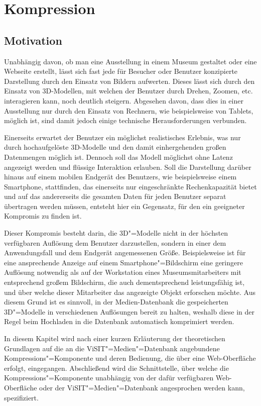 \section{Kompression}\label{sec:compression}

\subsection{Motivation}

Unabhängig davon, ob man eine Ausstellung in einem Museum gestaltet oder eine Webseite erstellt, lässt sich fast jede für Besucher oder Benutzer konzipierte Darstellung durch den Einsatz von Bildern aufwerten. Dieses lässt sich durch den Einsatz von 3D-Modellen, mit welchen der Benutzer durch Drehen, Zoomen, etc. interagieren kann, noch deutlich steigern. Abgesehen davon, dass dies in einer Ausstellung nur durch den Einsatz von Rechnern, wie beispielsweise von Tablets, möglich ist, sind damit jedoch einige technische Herausforderungen verbunden.

Einerseits erwartet der Benutzer ein möglichst realistisches Erlebnis, was nur durch hochaufgelöste 3D-Modelle und den damit einhergehenden großen Datenmengen möglich ist. Dennoch soll das Modell möglichst ohne Latenz angezeigt werden und flüssige Interaktion erlauben. Soll die Darstellung darüber hinaus auf einem mobilen Endgerät des Benutzers, wie beispielsweise einem Smartphone, stattfinden, das einerseits nur eingeschränkte Rechenkapazität bietet und auf das andererseits die gesamten Daten für jeden Benutzer separat übertragen werden müssen, entsteht hier ein Gegensatz, für den ein geeigneter Kompromis zu finden ist.

Dieser Kompromis besteht darin, die 3D"=Modelle nicht in der höchsten verfügbaren Auflösung dem Benutzer darzustellen, sondern in einer dem Anwendungsfall und dem Endgerät angemessenen Größe. Beispielsweise ist für eine ansprechende Anzeige auf einem Smartphone"=Bildschirm eine geringere Auflösung notwendig als auf der Workstation eines Museumsmitarbeiters mit entsprechend großem Bildschirm, die auch dementsprechend leistungsfähig ist, und über welche dieser Mitarbeiter das angezeigte Objekt erforschen möchte. Aus diesem Grund ist es sinnvoll, in der Medien-Datenbank die gespeicherten 3D"=Modelle in verschiedenen Auflösungen bereit zu halten, weshalb diese in der Regel beim Hochladen in die Datenbank automatisch komprimiert werden.

In diesem Kapitel wird nach einer kurzen Erläuterung der theoretischen Grundlagen auf die an die ViSIT"=Medien"=Datenbank angebundene Kompressions"=Komponente und deren Bedienung, die über eine Web-Oberfläche erfolgt, eingegangen. Abschließend wird die Schnittstelle, über welche die Kompressions"=Komponente unabhängig von der dafür verfügbaren Web-Oberfläche oder der ViSIT"=Medien"=Datenbank angesprochen werden kann, spezifiziert.

